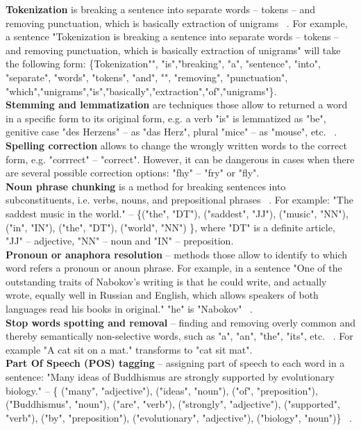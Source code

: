 \textbf{Tokenization} is breaking a sentence into separate words – tokens – and removing punctuation, which is basically extraction of unigrams ~\cite{token}. For example, a sentence "Tokenization is breaking a sentence into separate words – tokens – and removing punctuation, which is basically extraction of unigrams" will take the following form: \{Tokenization"", "is","breaking", "a", "sentence", "into", "separate", "words", "tokens", "and", "", "removing", "punctuation", "which","unigrams","is","basically","extraction","of","unigrams"\}. \\

\textbf{Stemming and lemmatization} are techniques those allow to returned a word in a specific form to its original form, e.g. a verb "is" is lemmatized as "be", genitive case "des Herzens" -- as "das Herz", plural "mice" -- as "mouse", etc. ~\cite{lemm}.\\

\textbf{Spelling correction} allows to change the wrongly written words to the correct form, e.g. "corrrect" -- "correct". However, it can be dangerous in cases when there are several possible correction options: "fhy" -- "fry" or "fly".\\

\textbf{Noun phrase chunking} is a method for breaking sentences into subconstituents, i.e. verbs, nouns, and prepositional phrases ~\cite{chunk}. For example: "The saddest music in the world." -- \{("the", "DT"), ("saddest", "JJ"), ("music", "NN"), ("in", "IN"), ("the", "DT"), ("world", "NN") \}, where "DT" is a definite article, "JJ" -- adjective, "NN" -- noun and "IN" -- preposition.\\

\textbf{Pronoun or anaphora resolution} -- methods those allow to identify to which word refers a pronoun or anoun phrase. For example, in a sentence "One of the outstanding traits of Nabokov's writing is that he could write, and actually wrote, equally well in Russian and English, which allows speakers of both languages read his books in original." "he" is "Nabokov" ~\cite{anaphora}.\\

\textbf{Stop words spotting and removal} -- finding and removing overly common and thereby semantically non-selective words, such as "a", "an", "the", "its", etc. ~\cite{stop}. For example "A cat sit on a mat." transforms to "cat sit mat".\\

\textbf{Part Of Speech (POS) tagging} -- assigning part of speech to each word in a sentence: "Many ideas of Buddhismus are strongly supported by evolutionary biology." -- \{ ("many", "adjective"), ("ideas", "noun"), ("of", "preposition"), ("Buddhismus", "noun"), ("are", "verb"), ("strongly", "adjective"), ("supported", "verb"), ("by", "preposition"), ("evolutionary", "adjective"),  ("biology", "noun")\} ~\cite{POS}.

